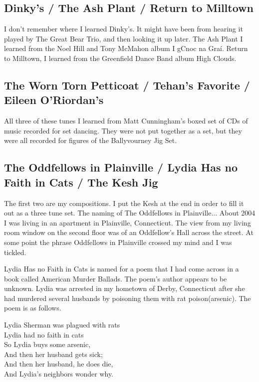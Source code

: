 \documentclass[9pt,letterpaper]{article}
\begin{document}
{\subsection{Dinky's / The Ash Plant / Return to Milltown}

I don't remember where I learned Dinky's. It might have been from hearing it played by The Great Bear Trio, and then looking it up later. The Ash Plant I learned from the Noel Hill and Tony McMahon album I gCnoc na Graí. Return to Milltown, I learned from the Greenfield Dance Band album High Clouds.

\subsection{The Worn Torn Petticoat / Tehan's Favorite / Eileen O'Riordan's}

All three of these tunes I learned from Matt Cunningham's boxed set of CDs of music recorded for set dancing. They were not put together as a set, but they were all recorded for figures of the Ballyvourney Jig Set.

\subsection{The Oddfellows in Plainville / Lydia Has no Faith in Cats / The Kesh Jig}

The first two are my compositions. I put the Kesh at the end in order to fill it out as a three tune set. The naming of The Oddfellows in Plainville... About 2004 I was living in an apartment in Plainville, Connecticut. The view from my living room window on the second floor was of an Oddfellow's Hall across the street. At some point the phrase Oddfellows in Plainville crossed my mind and I was tickled.

Lydia Has no Faith in Cats is named for a poem that I had come across in a book called American Murder Ballads. The poem's author appears to be unknown. Lydia was arrested in my hometown of Derby, Connecticut after she had murdered several husbands by poisoning them with rat poison(arsenic). The poem is as follows.

\hfill

\noindent Lydia Sherman was plagued with rats \\
Lydia had no faith in cats \\
So Lydia buys some arsenic, \\
And then her husband gets sick; \\
And then her husband, he does die, \\
And Lydia’s neighbors wonder why. \\

}
\end{document}
